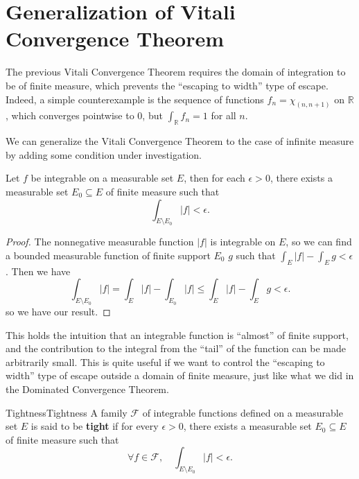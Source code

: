\documentclass[../main.tex]{subfiles}
\begin{document}
\section{Generalization of Vitali Convergence Theorem}

The previous Vitali Convergence Theorem requires the domain of integration to be of finite measure, which prevents the ``escaping to width'' type of escape. Indeed, a simple counterexample is the sequence of functions $f_n = \chi_{(n, n+1)}$ on $\mathbb{R}$, which converges pointwise to $0$, but $\int_{\mathbb{R}} f_n = 1$ for all $n$.

We can generalize the Vitali Convergence Theorem to the case of infinite measure by adding some condition under investigation.

\begin{proposition}{}{}
	Let $f$ be integrable on a measurable set $E$, then for each $\epsilon > 0$, there exists a measurable set $E_0 \subseteq E$ of finite measure such that
	\begin{equation}
		\int_{E \setminus E_0} |f| < \epsilon.
	\end{equation}
\end{proposition}
\begin{proof}
	The nonnegative measurable function $|f|$ is integrable on $E$, so we can find a bounded measurable function of finite support $E_0$ $g$ such that $\int_E |f| - \int_E g < \epsilon$. Then we have
	\begin{equation*}
		\int_{E \setminus E_0} |f| = \int_E |f| - \int_{E_0} |f| \leq \int_E |f| - \int_E g < \epsilon.
	\end{equation*}
	so we have our result.
\end{proof}
This holds the intuition that an integrable function is ``almost'' of finite support, and the contribution to the integral from the ``tail'' of the function can be made arbitrarily small. This is quite useful if we want to control the ``escaping to width'' type of escape outside a domain of finite measure, just like what we did in the Dominated Convergence Theorem.

\begin{definition}{Tightness}{Tightness}
	A family $\mathcal{F}$ of integrable functions defined on a measurable set $E$ is said to be \textbf{tight} if for every $\epsilon > 0$, there exists a measurable set $E_0 \subseteq E$ of finite measure such that
	\begin{equation}
		\forall f \in \mathcal{F}, \quad \int_{E \setminus E_0} |f| < \epsilon.
	\end{equation}
\end{definition}
\end{document}
